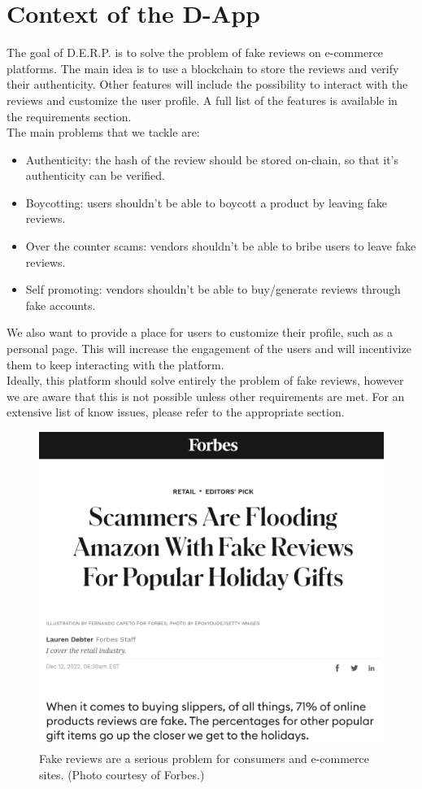 \documentclass[12pt,a4paper,oneside]{article}
\theoremstyle{definition}
\begin{document}
\section{Context of the D-App}
The goal of D.E.R.P. is to solve the problem of fake reviews on e-commerce platforms. The main idea is to use a blockchain to store the reviews and verify their authenticity. Other features will include the possibility to interact with the reviews and customize the user profile. A full list of the features is available in the requirements section. \\
The main problems that we tackle are:
\begin{itemize}
	\item Authenticity: the hash of the review should be stored on-chain, so that it's authenticity can be verified.
	\item Boycotting: users shouldn't be able to boycott a product by leaving fake reviews.
	\item Over the counter scams: vendors shouldn't be able to bribe users to leave fake reviews.
	\item Self promoting: vendors shouldn't be able to buy/generate reviews through fake accounts.
\end{itemize}

We also want to provide a place for users to customize their profile, such as a personal page. This will increase the engagement of the users and will incentivize them to keep interacting with the platform. \\
Ideally, this platform should solve entirely the problem of fake reviews, however we are aware that this is not possible unless other requirements are met. For an extensive list of know issues, please refer to the appropriate section.

\begin{figure}[H]
	\centering
	\includegraphics[width=.49\linewidth]{figures/forbes-amazon.png}
	\caption{Fake reviews are a serious problem for consumers and e-commerce sites. (Photo courtesy of Forbes.)}
\end{figure}
\end{document}
